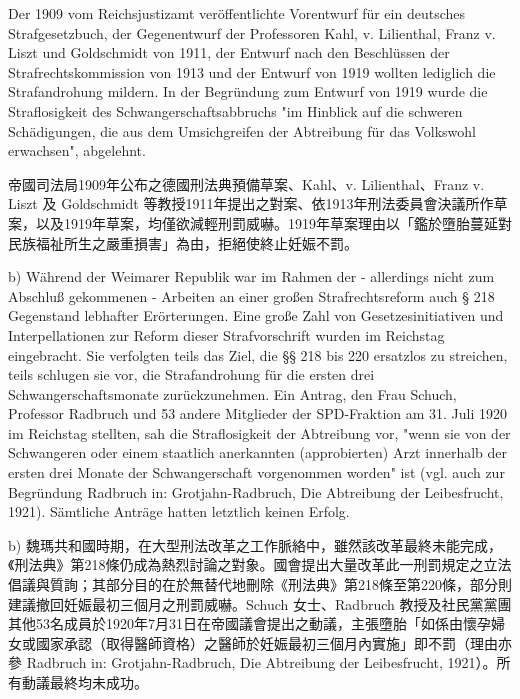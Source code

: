 \documentclass[12pt]{article}
\begin{document}
\syncleft
\begin{sourcepara}
Der 1909 vom Reichsjustizamt veröffentlichte Vorentwurf für ein deutsches Strafgesetzbuch, der Gegenentwurf der Professoren Kahl, v. Lilienthal, Franz v. Liszt und Goldschmidt von 1911, der Entwurf nach den Beschlüssen der Strafrechtskommission von 1913 und der Entwurf von 1919 wollten lediglich die Strafandrohung mildern. In der Begründung zum Entwurf von 1919 wurde die Straflosigkeit des Schwangerschaftsabbruchs "im Hinblick auf die schweren Schädigungen, die aus dem Umsichgreifen der Abtreibung für das Volkswohl erwachsen", abgelehnt.
\end{sourcepara}
\begin{transpara}
帝國司法局1909年公布之德國刑法典預備草案、Kahl、v. Lilienthal、Franz v. Liszt 及 Goldschmidt 等教授1911年提出之對案、依1913年刑法委員會決議所作草案，以及1919年草案，均僅欲減輕刑罰威嚇。1919年草案理由以「鑑於墮胎蔓延對民族福祉所生之嚴重損害」為由，拒絕使終止妊娠不罰。
\end{transpara}

\syncleft
\begin{sourcepara}
b) Während der Weimarer Republik war im Rahmen der - allerdings nicht zum Abschluß gekommenen - Arbeiten an einer großen Strafrechtsreform auch § 218 \abbrStGB{} Gegenstand lebhafter Erörterungen. Eine große Zahl von Gesetzesinitiativen und Interpellationen zur Reform dieser Strafvorschrift wurden im Reichstag eingebracht. Sie verfolgten teils das Ziel, die §§ 218 bis 220 \abbrStGB{} ersatzlos zu streichen, teils schlugen sie vor, die Strafandrohung für die ersten drei Schwangerschaftsmonate zurückzunehmen. Ein Antrag, den Frau Schuch, Professor Radbruch und 53 andere Mitglieder der SPD-Fraktion am 31. Juli 1920 im Reichstag stellten, sah die Straflosigkeit der Abtreibung vor, "wenn sie von der Schwangeren oder einem staatlich anerkannten (approbierten) Arzt innerhalb der ersten drei Monate der Schwangerschaft vorgenommen worden" ist (vgl. auch zur Begründung Radbruch in: Grotjahn-Radbruch, Die Abtreibung der Leibesfrucht, 1921). Sämtliche Anträge hatten letztlich keinen Erfolg.
\end{sourcepara}
\begin{transpara}
b) 魏瑪共和國時期，在大型刑法改革之工作脈絡中，雖然該改革最終未能完成，《刑法典》第218條仍成為熱烈討論之對象。國會提出大量改革此一刑罰規定之立法倡議與質詢；其部分目的在於無替代地刪除《刑法典》第218條至第220條，部分則建議撤回妊娠最初三個月之刑罰威嚇。Schuch 女士、Radbruch 教授及社民黨黨團其他53名成員於1920年7月31日在帝國議會提出之動議，主張墮胎「如係由懷孕婦女或國家承認（取得醫師資格）之醫師於妊娠最初三個月內實施」即不罰（理由亦參 Radbruch in: Grotjahn-Radbruch, Die Abtreibung der Leibesfrucht, 1921）。所有動議最終均未成功。
\end{transpara}
\end{document}

